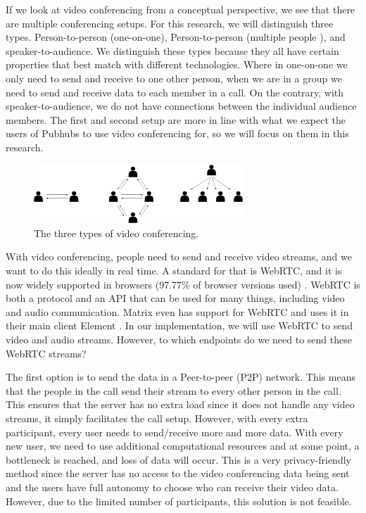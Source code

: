 \documentclass{report}
\begin{document}
If we look at video conferencing from a conceptual perspective, we see that there are multiple conferencing setups.
For this research, we will distinguish three types. Person-to-person (one-on-one), Person-to-person (multiple people
), and speaker-to-audience. We distinguish these types because they all have certain properties that best match with
different technologies. Where in one-on-one we only need to send and receive to one other person, when we are in a
group we need to send and receive data to each member in a call. On the contrary, with speaker-to-audience, we do
not have connections between the individual audience members. The first and second setup are more in line with what
we expect the users of Pubhubs to use video conferencing for, so we will focus on them in this research.

\begin{figure}[!hbt]
\centering
\includegraphics[width=0.7\textwidth]{img/three-types}
\caption{The three types of video conferencing.}
\label{fig:three-types-video-conferencing}
\end{figure}

With video conferencing, people need to send and receive video streams, and we want to do this ideally in real time.
A standard for that is WebRTC, and it is now widely supported in browsers (97.77\% of browser versions used) \cite{
noauthor_webrtc_nodate}. WebRTC is both a protocol and an API that can be used for many things, including video and audio communication.
Matrix even has support for WebRTC and uses it in their main client Element \cite{noauthor_element_nodate}. In our
implementation, we will use WebRTC to send video and audio streams. However, to which endpoints do we need
to send these WebRTC streams?

The first option is to send the data in a Peer-to-peer (P2P) network. This means that the people in the call send
their stream to every other person in the call. This ensures that the server has no extra load since it does not
handle any video streams, it simply facilitates the call setup. However, with every extra participant, every user
needs to send/receive more and more data. With every new user, we need to use additional computational resources and at
some point, a bottleneck is reached, and loss of data will occur. This is a very privacy-friendly method since the
server has no access to the video conferencing data being sent and the users have full autonomy to choose who can
receive their video data. However, due to the limited number of participants, this solution is not feasible.
\end{document}
